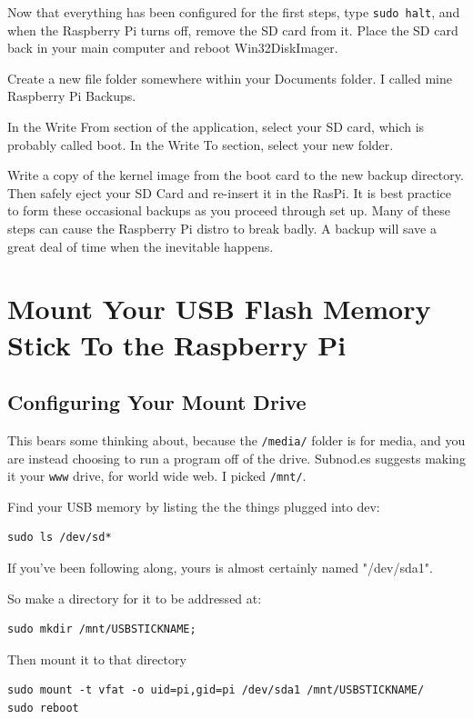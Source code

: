 Now that everything has been configured for the first steps, type \texttt{sudo halt}, and when the Raspberry Pi turns off, remove the SD card from it. Place the SD card back in your main computer and reboot Win32DiskImager.

Create a new file folder somewhere within your Documents folder. I called mine Raspberry Pi Backups.

In the Write From section of the application, select your SD card, which is probably called boot. In the Write To section, select your new folder. 

Write a copy of the kernel image from the boot card to the new backup directory. Then safely eject your SD Card and re-insert it in the RasPi. It is best practice to form these occasional backups as you proceed through set up. Many of these steps can cause the Raspberry Pi distro to break badly. A backup will save a great deal of time when the inevitable happens.

\section{Mount Your USB Flash Memory Stick To the Raspberry Pi}

\subsection{Configuring Your Mount Drive}
This bears some thinking about, because the \texttt{/media/} folder is for media, and you are instead choosing to run a program off of the drive. Subnod.es suggests making it your \texttt{www} drive, for world wide web. I picked \texttt{/mnt/}.

Find your USB memory by listing the the things plugged into dev:
\begin{lstlisting}
sudo ls /dev/sd*
\end{lstlisting}

If you've been following along, yours is almost certainly named "/dev/sda1".

So make a directory for it to be addressed at:
\begin{lstlisting}
sudo mkdir /mnt/USBSTICKNAME;
\end{lstlisting}

Then mount it to that directory
\begin{lstlisting}
sudo mount -t vfat -o uid=pi,gid=pi /dev/sda1 /mnt/USBSTICKNAME/
sudo reboot
\end{lstlisting}

